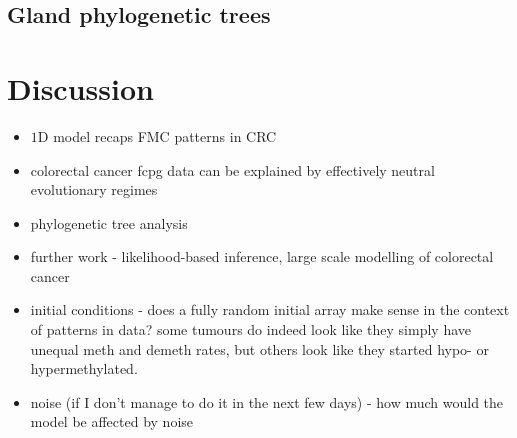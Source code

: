 \subsection{Gland phylogenetic trees}


\section{Discussion}
\begin{itemize}
    \item $1$D model recaps FMC patterns in CRC
    \item colorectal cancer fcpg data can be explained by effectively neutral
        evolutionary regimes
    \item phylogenetic tree analysis
    \item further work - likelihood-based inference, large scale modelling of
        colorectal cancer
    \item initial conditions - does a fully random initial array make sense in
        the context of patterns in data? some tumours do indeed look like they
        simply have unequal meth and demeth rates, but others look like they
        started hypo- or hypermethylated.
    \item noise (if I don't manage to do it in the next few days) - how much
        would the model be affected by noise
\end{itemize}





